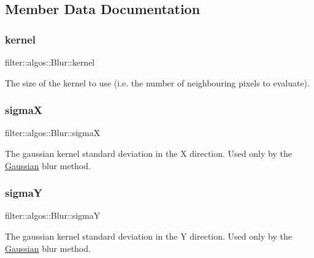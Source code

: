 \subsection{Member Data Documentation}
\mbox{\label{classfilter_1_1algos_1_1_blur_aac3d6d8af63e5ad496fde537dc3d55aa}} 
\subsubsection{\texorpdfstring{kernel}{kernel}}
{\footnotesize\ttfamily filter\+::algos\+::\+Blur\+::kernel}

The size of the kernel to use (i.\+e. the number of neighbouring pixels to evaluate). \mbox{\label{classfilter_1_1algos_1_1_blur_a3b511f5fb439b9424c18141efd94b0c1}} 
\subsubsection{\texorpdfstring{sigmaX}{sigmaX}}
{\footnotesize\ttfamily filter\+::algos\+::\+Blur\+::sigmaX}

The gaussian kernel standard deviation in the X direction. Used only by the \hyperlink{classfilter_1_1algos_1_1_gaussian}{Gaussian} blur method. \mbox{\label{classfilter_1_1algos_1_1_blur_ac41e02492b5ab6ac6578176b11f013fc}} 
\subsubsection{\texorpdfstring{sigmaY}{sigmaY}}
{\footnotesize\ttfamily filter\+::algos\+::\+Blur\+::sigmaY}

The gaussian kernel standard deviation in the Y direction. Used only by the \hyperlink{classfilter_1_1algos_1_1_gaussian}{Gaussian} blur method. \mbox{\label{classfilter_1_1algos_1_1_blur_ac678a666d1d708d882222b198e9d9b10}} 
